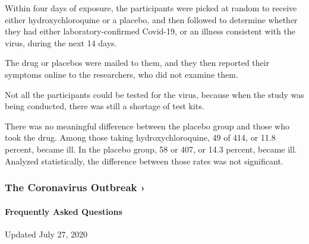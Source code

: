 Within four days of exposure, the participants were picked at random to
receive either hydroxychloroquine or a placebo, and then followed to
determine whether they had either laboratory-confirmed Covid-19, or an
illness consistent with the virus, during the next 14 days.

The drug or placebos were mailed to them, and they then reported their
symptoms online to the researchers, who did not examine them.

Not all the participants could be tested for the virus, because when the
study was being conducted, there was still a shortage of test kits.

There was no meaningful difference between the placebo group and those
who took the drug. Among those taking hydroxychloroquine, 49 of 414, or
11.8 percent, became ill. In the placebo group, 58 or 407, or 14.3
percent, became ill. Analyzed statistically, the difference between
those rates was not significant.

\href{https://www.nytimes3xbfgragh.onion/news-event/coronavirus?action=click\&pgtype=Article\&state=default\&region=MAIN_CONTENT_3\&context=storylines_faq}{}

\hypertarget{the-coronavirus-outbreak-}{%
\subsubsection{The Coronavirus Outbreak
›}\label{the-coronavirus-outbreak-}}

\hypertarget{frequently-asked-questions}{%
\paragraph{Frequently Asked
Questions}\label{frequently-asked-questions}}

Updated July 27, 2020

